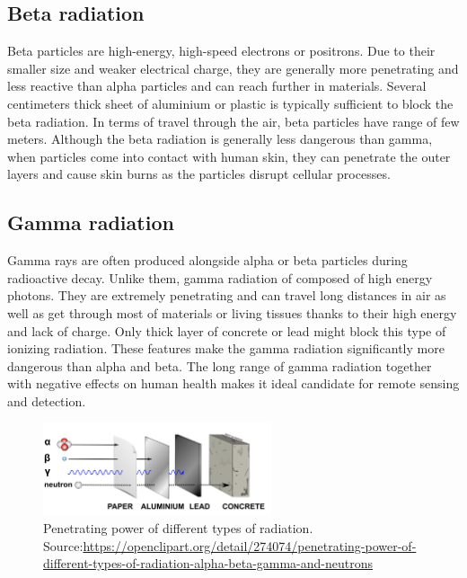 \subsection{Beta radiation}
Beta particles are high-energy, high-speed electrons or positrons.
Due to their smaller size and weaker electrical charge, they are generally more penetrating and less reactive than alpha particles and can reach further in materials.
Several centimeters thick sheet of aluminium or plastic is typically sufficient to block the beta radiation.
In terms of travel through the air, beta particles have range of few meters.
Although the beta radiation is generally less dangerous than gamma, when particles come into contact with human skin, they can penetrate the outer layers and cause skin burns as the particles disrupt cellular processes.

\subsection{Gamma radiation}
Gamma rays are often produced alongside alpha or beta particles during radioactive decay. 
Unlike them, gamma radiation of composed of high energy photons. 
They are extremely penetrating and can travel long distances in air as well as get through most of materials or living tissues thanks to their high energy and lack of charge.
Only thick layer of concrete or lead might block this type of ionizing radiation.
These features make the gamma radiation significantly more dangerous than alpha and beta.
The long range of gamma radiation together with negative effects on human health makes it ideal candidate for remote sensing and detection.

  \begin{figure}[!h]
    \centering
      \includegraphics[width=0.6\textwidth]{./fig/photos/pene2.png}
    \caption{Penetrating power of different types of radiation. Source:\url{https://openclipart.org/detail/274074/penetrating-power-of-different-types-of-radiation-alpha-beta-gamma-and-neutrons}}
  \end{figure}

